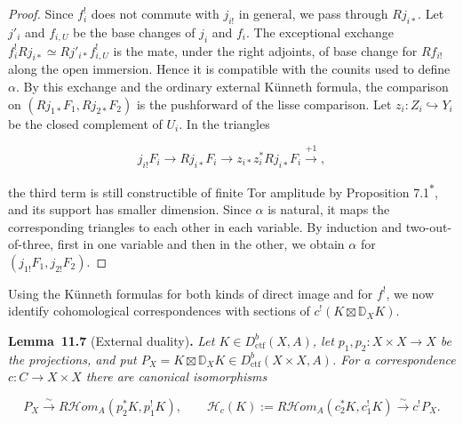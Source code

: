 \documentclass[11pt]{article}
\newenvironment{bpstatement}[2]{\par\addvspace{0.6\baselineskip}\noindent\textbf{#1}#2\textbf{.}\enspace\ignorespaces}
  {\par\addvspace{0.4\baselineskip}}
\newenvironment{bpstatementit}[2]{\begin{bpstatement}{#1}{#2}\itshape\ignorespaces}{\end{bpstatement}}
\newcommand{\bpout}[1]{#1\textsuperscript{\hyperlink{bp-outside}{\ensuremath{\ast}}}}
\providecommand{\cHom}{}\renewcommand{\cHom}{R\mathcal{H}\!om}
\begin{document}
\begin{proof}[{Proof}]
Since \(f_i^!\) does not commute with \(j_{i!}\) in general, we pass through \(Rj_{i*}\). Let \(j'_i\) and \(f_{i,U}\) be the base changes of \(j_i\) and \(f_i\). The exceptional exchange \(f_i^!Rj_{i*}\simeq Rj'_{i*}f_{i,U}^!\) is the mate, under the right adjoints, of base change for \(Rf_{i!}\) along the open immersion. Hence it is compatible with the counits used to define \(\alpha\). By this exchange and the ordinary external Künneth formula, the comparison on \((Rj_{1*}F_1,Rj_{2*}F_2)\) is the pushforward of the lisse comparison. Let \(z_i:Z_i\hookrightarrow Y_i\) be the closed complement of \(U_i\). In the triangles

\[
j_{i!}F_i\longrightarrow Rj_{i*}F_i\longrightarrow
z_{i*}z_i^*Rj_{i*}F_i\xrightarrow{+1},
\]

the third term is still constructible of finite Tor amplitude by Proposition \bpout{7.1}, and its support has smaller dimension. Since \(\alpha\) is natural, it maps the corresponding triangles to each other in each variable. By induction and two-out-of-three, first in one variable and then in the other, we obtain \(\alpha\) for \((j_{1!}F_1,j_{2!}F_2)\).
\end{proof}

\label{bp190}%
Using the Künneth formulas for both kinds of direct image and for \(f^!\), we now identify cohomological correspondences with sections of \(c^!(K\boxtimes\mathbb D_XK)\).

\label{bp191}%
\begin{bpstatementit}{Lemma~11.7}{ (External duality)}
Let \(K\in D^b_{\mathrm{ctf}}(X,A)\), let \(p_1,p_2:X\times X\to X\) be the projections, and put \(P_X=K\boxtimes \mathbb D_XK\in D^b_{\mathrm{ctf}}(X\times X,A)\). For a correspondence \(c:C\to X\times X\) there are canonical isomorphisms

\[
P_X\xrightarrow{\sim}\cHom_A(p_2^*K,p_1^!K),
\qquad
\mathcal H_c(K):=\cHom_A(c_2^*K,c_1^!K)
\xrightarrow{\sim}c^!P_X.
\]
\end{bpstatementit}
\end{document}

